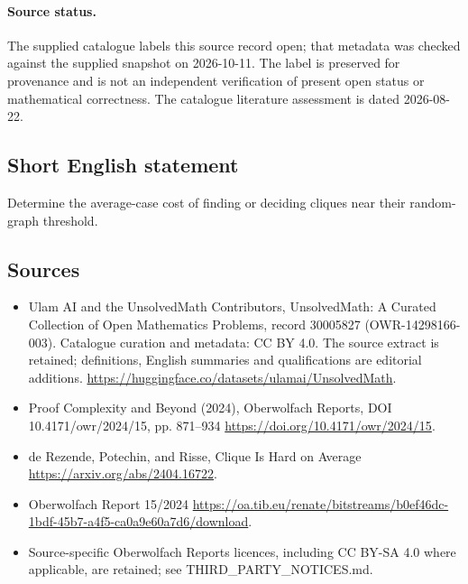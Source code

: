 \documentclass[11pt]{article}
\begin{document}
\paragraph{Source status.}
The supplied catalogue labels this source record open; that metadata was checked against the supplied snapshot on 2026-10-11. The label is preserved for provenance and is not an independent verification of present open status or mathematical correctness. The catalogue literature assessment is dated 2026-08-22.
\subsection{Short English statement}
Determine the average-case cost of finding or deciding cliques near their random-graph threshold.
\subsection{Sources}
\begin{itemize}
\item[\hypertarget{source:30005827:1}{S1}] Ulam AI and the UnsolvedMath Contributors, UnsolvedMath: A Curated Collection of Open Mathematics Problems, record 30005827 (OWR-14298166-003). Catalogue curation and metadata: CC BY 4.0. The source extract is retained; definitions, English summaries and qualifications are editorial additions.
\url{https://huggingface.co/datasets/ulamai/UnsolvedMath}.
\item[\hypertarget{source:30005827:2}{S2}] Proof Complexity and Beyond (2024), Oberwolfach Reports, DOI 10.4171/owr/2024/15, pp. 871--934
\url{https://doi.org/10.4171/owr/2024/15}.
\item[\hypertarget{source:30005827:3}{S3}] de Rezende, Potechin, and Risse, Clique Is Hard on Average
\url{https://arxiv.org/abs/2404.16722}.
\item[\hypertarget{source:30005827:4}{S4}] Oberwolfach Report 15/2024
\url{https://oa.tib.eu/renate/bitstreams/b0ef46dc-1bdf-45b7-a4f5-ca0a9e60a7d6/download}.
\item Source-specific Oberwolfach Reports licences, including CC BY-SA 4.0 where applicable, are retained; see THIRD\_PARTY\_NOTICES.md.
\end{itemize}
\end{document}
